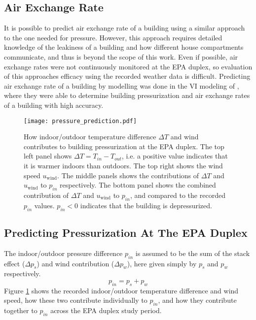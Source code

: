 \subsection{Air Exchange Rate}

It is possible to predict air exchange rate of a building using a similar approach to the one needed for pressure.
However, this approach requires detailed knowledge of the leakiness of a building and how different house compartments communicate, and thus is beyond the scope of this work.
Even if possible, air exchange rates were not continuously monitored at the EPA duplex, so evaluation of this approaches efficacy using the recorded weather data is difficult.
Predicting air exchange rate of a building by modelling was done in the VI modeling of \citeauthor{shirazi_three-dimensional_2017}\cite{shirazi_three-dimensional_2017}, where they were able to determine building pressurization and air exchange rates of a building with high accuracy.\par

\begin{figure}[htb!]
  \centering
  \texttt{[image: pressure\_prediction.pdf]}
  \caption[Temperature and wind contribution to building pressurization.]{How indoor/outdoor temperature difference $\Delta T$ and wind contributes to building pressurization at the EPA duplex. The top left panel shows $\Delta T = T_{in} - T_{out}$, i.e. a positive value indicates that it is warmer indoors than outdoors. The top right shows the wind speed $u_\mathrm{wind}$. The middle panels shows the  contributions of $\Delta T$ and $u_\mathrm{wind}$ to $p_{in}$ respectively. The bottom panel shows the combined contribution of $\Delta T$ and $u_\mathrm{wind}$ to $p_{in}$, and compared to the recorded $p_{in}$ values. $p_{in} < 0$ indicates that the building is depressurized.}
  \label{fig:pressure_prediction}
\end{figure}

\subsection{Predicting Pressurization At The EPA Duplex}

The indoor/outdoor pressure difference $p_{in}$ is assumed to be the sum of the stack effect ($\Delta p_s $) and wind contribution ($\Delta p_w$), here given simply by $p_s$ and $p_w$ respectively.
\begin{equation}
  p_{in} = p_s + p_w
\end{equation}
Figure \ref{fig:pressure_prediction} shows the recorded indoor/outdoor temperature difference and wind speed, how these two contribute individually to $p_{in}$, and how they contribute together to $p_{in}$ across the EPA duplex study period.\par


